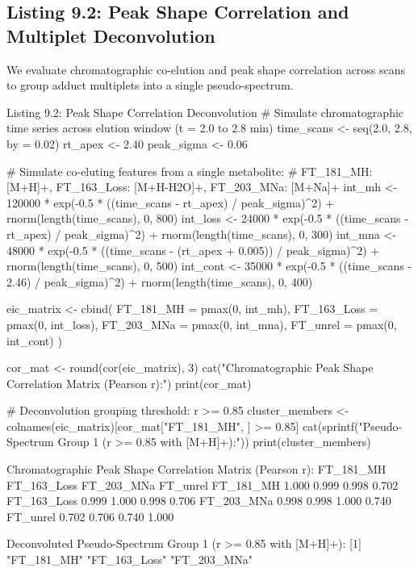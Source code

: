 \documentclass[11pt,twoside,openright]{book}
\begin{document}
\subsection{Listing 9.2: Peak Shape Correlation and Multiplet Deconvolution}

We evaluate chromatographic co-elution and peak shape correlation across scans to group adduct multiplets into a single pseudo-spectrum.

\begin{rchunk}{Listing 9.2: Peak Shape Correlation Deconvolution}
# Simulate chromatographic time series across elution window (t = 2.0 to 2.8 min)
time_scans <- seq(2.0, 2.8, by = 0.02)
rt_apex <- 2.40
peak_sigma <- 0.06

# Simulate co-eluting features from a single metabolite:
# FT_181_MH: [M+H]+, FT_163_Loss: [M+H-H2O]+, FT_203_MNa: [M+Na]+
int_mh   <- 120000 * exp(-0.5 * ((time_scans - rt_apex) / peak_sigma)^2) + rnorm(length(time_scans), 0, 800)
int_loss <-  24000 * exp(-0.5 * ((time_scans - rt_apex) / peak_sigma)^2) + rnorm(length(time_scans), 0, 300)
int_mna  <-  48000 * exp(-0.5 * ((time_scans - (rt_apex + 0.005)) / peak_sigma)^2) + rnorm(length(time_scans), 0, 500)
int_cont <-  35000 * exp(-0.5 * ((time_scans - 2.46) / peak_sigma)^2) + rnorm(length(time_scans), 0, 400)

eic_matrix <- cbind(
  FT_181_MH   = pmax(0, int_mh),
  FT_163_Loss = pmax(0, int_loss),
  FT_203_MNa  = pmax(0, int_mna),
  FT_unrel    = pmax(0, int_cont)
)

cor_mat <- round(cor(eic_matrix), 3)
cat("Chromatographic Peak Shape Correlation Matrix (Pearson r):\n")
print(cor_mat)

# Deconvolution grouping threshold: r >= 0.85
cluster_members <- colnames(eic_matrix)[cor_mat["FT_181_MH", ] >= 0.85]
cat(sprintf("\nDeconvoluted Pseudo-Spectrum Group 1 (r >= 0.85 with [M+H]+):\n"))
print(cluster_members)
\end{rchunk}

\begin{routput}
Chromatographic Peak Shape Correlation Matrix (Pearson r):
            FT\_181\_MH FT\_163\_Loss FT\_203\_MNa FT\_unrel
FT\_181\_MH       1.000       0.999      0.998    0.702
FT\_163\_Loss     0.999       1.000      0.998    0.706
FT\_203\_MNa      0.998       0.998      1.000    0.740
FT\_unrel        0.702       0.706      0.740    1.000

Deconvoluted Pseudo-Spectrum Group 1 (r >= 0.85 with [M+H]+):
{}[1] "FT\_181\_MH"   "FT\_163\_Loss" "FT\_203\_MNa" 
\end{routput}
\end{document}
